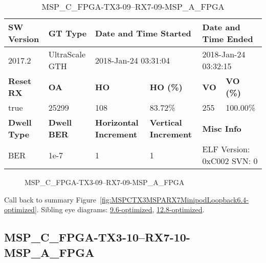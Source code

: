 \begin{table}[h]
\centering
\caption{MSP\_C\_FPGA-TX3-09--RX7-09-MSP\_A\_FPGA}
\label{tab:MSPCFPGATX309RX709MSPAFPGA6.4-optimized}
\begin{tabular}{@{}|l|l|l|l|l|l|@{}}
\toprule
\textbf{SW Version}                & \textbf{GT Type}   & \multicolumn{2}{l|}{\textbf{Date and Time Started}}            & \multicolumn{2}{l|}{\textbf{Date and Time Ended}}        \\ \midrule
2017.2                       & UltraScale GTH          & \multicolumn{2}{l|}{2018-Jan-24 03:31:04}                   & \multicolumn{2}{l|}{2018-Jan-24 03:32:15}               \\ \midrule
\textbf{Reset RX}                  & \textbf{OA} & \textbf{HO}   & \textbf{HO (\%)} & \textbf{VO} & \textbf{VO (\%)} \\ \midrule
true & 25299        & 108          & 83.72\%        & 255        & 100.00\%       \\ \midrule
\textbf{Dwell Type}                & \textbf{Dwell BER} & \textbf{Horizontal Increment} & \textbf{Vertical Increment}    & \multicolumn{2}{l|}{\textbf{Misc Info}}                  \\ \midrule
BER                            & 1e-7        & 1        & 1           & \multicolumn{2}{l|}{ELF Version: 0xC002 SVN: 0}                         \\ \bottomrule
\end{tabular}
\end{table}

\begin{figure}[h]
\caption{MSP\_C\_FPGA-TX3-09--RX7-09-MSP\_A\_FPGA} \label{fig:MSPCFPGATX309RX709MSPAFPGA6.4-optimized}
\end{figure}

Call back to summary Figure~\ref{fig:MSPCTX3MSPARX7MinipodLoopback6.4-optimized}.
Sibling eye diagrams: \hyperref[sec:MSPCFPGATX309RX709MSPAFPGA9.6-optimized]{9.6-optimized}, \hyperref[sec:MSPCFPGATX309RX709MSPAFPGA12.8-optimized]{12.8-optimized}.

\clearpage
\newpage


\subsection{MSP\_C\_FPGA-TX3-10--RX7-10-MSP\_A\_FPGA}\label{sec:MSPCFPGATX310RX710MSPAFPGA6.4-optimized}

